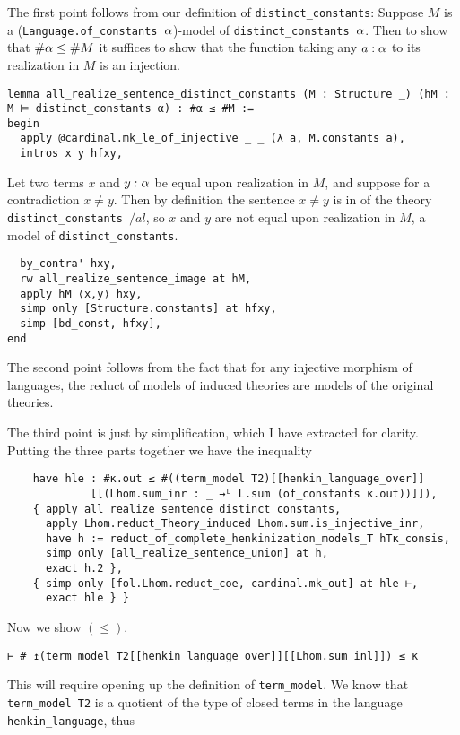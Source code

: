 The first point follows from our definition of \texttt{distinct\_constants}:
Suppose $M$ is a (\texttt{Language.of\_constants $\alpha$})-model of
\texttt{distinct\_constants $\alpha$}.
Then to show that $\# \alpha \le \# M$ it suffices to show that the function
taking any $a : \alpha$ to its realization in $M$ is an injection.
\begin{lstlisting}
lemma all_realize_sentence_distinct_constants (M : Structure _) (hM : M ⊨ distinct_constants α) : #α ≤ #M :=
begin
  apply @cardinal.mk_le_of_injective _ _ (λ a, M.constants a),
  intros x y hfxy, \end{lstlisting}
Let two terms $x$ and $y : \alpha$ be equal upon realization in $M$,
and suppose for a contradiction $x \ne y$.
Then by definition the sentence $x \ne y$ is in
of the theory \texttt{distinct\_constants $/al$}, so
$x$ and $y$ are not equal upon realization in $M$,
a model of \texttt{distinct\_constants}.
\begin{lstlisting}
  by_contra' hxy,
  rw all_realize_sentence_image at hM,
  apply hM ⟨x,y⟩ hxy,
  simp only [Structure.constants] at hfxy,
  simp [bd_const, hfxy],
end \end{lstlisting}

The second point follows from the fact that
for any injective morphism of languages,
the reduct of models of induced theories are models of the original theories.

The third point is just by simplification, which I have extracted for clarity.
Putting the three parts together we have the inequality
\begin{lstlisting}
    have hle : #κ.out ≤ #((term_model T2)[[henkin_language_over]]
             [[(Lhom.sum_inr : _ →ᴸ L.sum (of_constants κ.out))]]),
    { apply all_realize_sentence_distinct_constants,
      apply Lhom.reduct_Theory_induced Lhom.sum.is_injective_inr,
      have h := reduct_of_complete_henkinization_models_T hTκ_consis,
      simp only [all_realize_sentence_union] at h,
      exact h.2 },
    { simp only [fol.Lhom.reduct_coe, cardinal.mk_out] at hle ⊢,
      exact hle } } \end{lstlisting}

Now we show $(\le)$.
\begin{lstlisting}
⊢ # ↥(term_model T2[[henkin_language_over]][[Lhom.sum_inl]]) ≤ κ \end{lstlisting}
This will require opening up the definition of \texttt{term\_model}.
We know that \texttt{term\_model T2} is a quotient of the type of closed
terms in the language \texttt{henkin\_language}, thus

